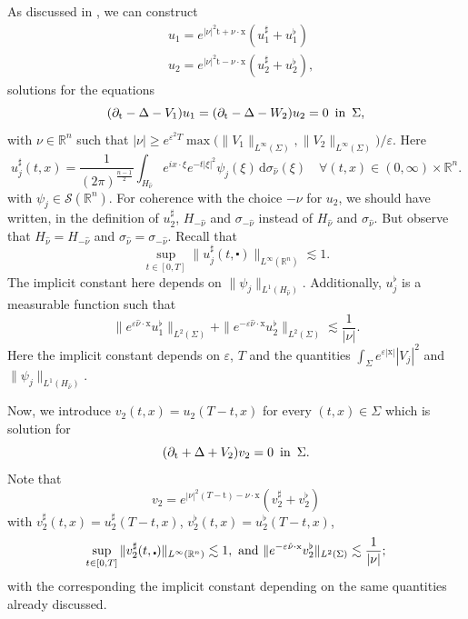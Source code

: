 \documentclass[10pt,a4paper]{amsart}
\theoremstyle{remark}
\theoremstyle{definition}
\newcommand{\R}{\mathbb{R}}
\newcommand{\dd}{\mathrm{d}}
\newcommand{\tm}{\mathrm{t}}
\newcommand{\x}{\mathrm{x}}
\begin{document}
As discussed in , 
we can construct
\begin{align*}
& u_1 = e^{|\nu|^2 \tm + \nu \cdot \x} (u_1^\sharp + u_1^\flat)\\
& u_2 = e^{|\nu|^2 \tm - \nu \cdot \x} (u_2^\sharp + u_2^\flat),
\end{align*}
solutions for the equations
\begin{equation*}
(\partial_\tm - \Delta - V_1) u_1 = (\partial_\tm - \Delta - W_2) u_2 = 0 \enspace \textnormal{in} \enspace \Sigma,
\end{equation*}
with $\nu \in \R^n $ such that 
$|\nu| \geq e^{\varepsilon^2 T} \max\big(\| V_1 \|_{L^\infty (\Sigma)}, \| V_2 \|_{L^\infty (\Sigma)}\big)/\varepsilon$. Here
\begin{equation*}
u_j^\sharp (t, x) = \frac{1}{(2\pi)^\frac{n-1}{2}} \int_{H_{\hat{\nu}}} e^{ix \cdot \xi} e^{- t |\xi|^2} {\psi_j}(\xi) \, \dd \sigma_{\hat{\nu}} (\xi) \quad \forall (t, x) \in (0,\infty) \times \R^n.
\end{equation*}
with $\psi_j \in \mathcal{S}(\R^n)$.
For coherence with the choice $-\nu$ for $u_2$, we should have 
written, in the definition of $u_2^\sharp$, $H_{-\hat \nu}$ and $\sigma_{-\hat \nu}$
instead of $H_{\hat \nu}$ and $\sigma_{\hat \nu}$. But observe that 
$H_{\hat \nu} = H_{-\hat \nu}$ and $\sigma_{\hat \nu} = \sigma_{-\hat \nu}$.
Recall that
\[\sup_{t \in [0, T]} \| u_j^\sharp (t, \centerdot) \|_{L^\infty(\R^n)} \lesssim 1.\]
The implicit constant here depends on $\| \psi_j \|_{L^1(H_{\hat \nu})}$.
Additionally, $u_j^\flat$ is a measurable function such that
\[ \| e^{\varepsilon \hat{\nu} \cdot \x} u_1^\flat \|_{L^2(\Sigma)} + \| e^{- \varepsilon \hat{\nu} \cdot \x} u_2^\flat \|_{L^2(\Sigma)} \lesssim \frac{1}{|\nu|}. \]
Here the implicit constant depends on 
$\varepsilon$, $T$ and the quantities $\int_\Sigma e^{ \varepsilon |\x|} |V_j|^2$ and
$\| \psi_j \|_{L^1(H_{\hat \nu})}$.

Now, we introduce $v_2(t, x) = u_2(T-t,x)$ for every $(t, x) \in \Sigma$
which is solution for 
\begin{equation*}
(\partial_\tm + \Delta + V_2) v_2 = 0 \enspace \textnormal{in} \enspace \Sigma.
\end{equation*}
Note that
\[v_2 = e^{|\nu|^2 (T - \tm) - \nu \cdot \x} (v_2^\sharp + v_2^\flat)\]
with $v_2^\sharp (t, x) = u_2^\sharp (T-t,x)$, $v_2^\flat (t, x) = u_2^\flat (T-t,x)$,
\[ \sup_{t \in [0, T]} \| v_2^\sharp (t, \centerdot) \|_{L^\infty(\R^n)} \lesssim 1, \textnormal{ and } \| e^{- \varepsilon \hat{\nu} \cdot \x} v_2^\flat \|_{L^2(\Sigma)} \lesssim \frac{1}{|\nu|}; \]
with the corresponding the implicit constant depending on the same quantities already 
discussed.
\end{document}
